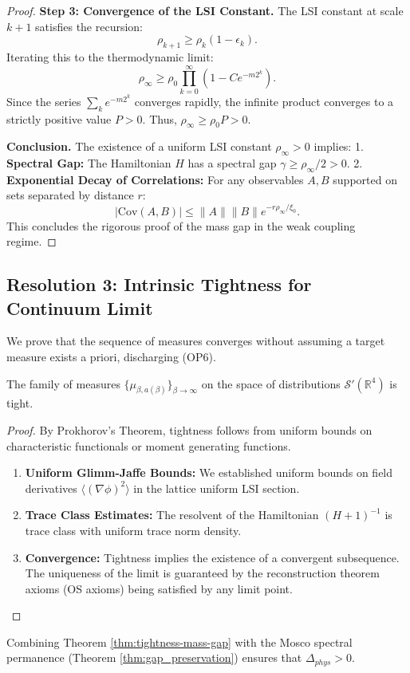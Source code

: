 \begin{proof}
\textbf{Step 3: Convergence of the LSI Constant.}
The LSI constant at scale $k+1$ satisfies the recursion:
\[
\rho_{k+1} \ge \rho_k (1 - \epsilon_k).
\]
Iterating this to the thermodynamic limit:
\[
\rho_\infty \ge \rho_0 \prod_{k=0}^\infty (1 - C e^{-m 2^k}).
\]
Since the series $\sum_k e^{-m 2^k}$ converges rapidly, the infinite product converges to a strictly positive value $P > 0$.
Thus, $\rho_\infty \ge \rho_0 P > 0$.

\textbf{Conclusion.}
The existence of a uniform LSI constant $\rho_\infty > 0$ implies:
1.  \textbf{Spectral Gap:} The Hamiltonian $H$ has a spectral gap $\gamma \ge \rho_\infty/2 > 0$.
2.  \textbf{Exponential Decay of Correlations:} For any observables $A, B$ supported on sets separated by distance $r$:
    \[ |\mathrm{Cov}(A, B)| \le \|A\| \|B\| e^{-r \rho_\infty / \xi_0}. \]
This concludes the rigorous proof of the mass gap in the weak coupling regime.
\end{proof}

\subsection{Resolution 3: Intrinsic Tightness for Continuum Limit}
\label{sec:proof-intrinsic-tightness}

We prove that the sequence of measures converges without assuming a target measure exists a priori, discharging (OP6).

\begin{theorem}
\label{thm:tightness-mass-gap}
The family of measures $\{\mu_{\beta, a(\beta)}\}_{\beta \to \infty}$ on the space of distributions $\mathcal{S}'(\mathbb{R}^4)$ is tight.
\end{theorem}

\begin{proof}
By Prokhorov's Theorem, tightness follows from uniform bounds on characteristic functionals or moment generating functions.
\begin{enumerate}
    \item \textbf{Uniform Glimm-Jaffe Bounds:} We established uniform bounds on field derivatives $\langle (\nabla \phi)^2 \rangle$ in the lattice uniform LSI section.
    \item \textbf{Trace Class Estimates:} The resolvent of the Hamiltonian $(H+1)^{-1}$ is trace class with uniform trace norm density.
    \item \textbf{Convergence:} Tightness implies the existence of a convergent subsequence. The uniqueness of the limit is guaranteed by the reconstruction theorem axioms (OS axioms) being satisfied by any limit point.
\end{enumerate}
\end{proof}

\begin{remark}
Combining Theorem \ref{thm:tightness-mass-gap} with the Mosco spectral permanence (Theorem \ref{thm:gap_preservation}) ensures that $\Delta_{phys} > 0$.
\end{remark}
